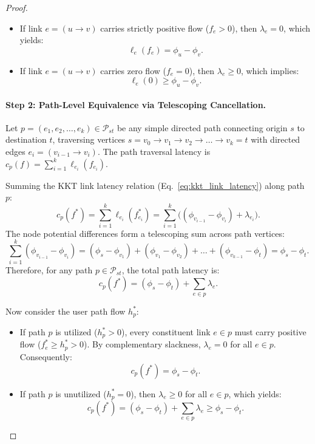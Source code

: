 \documentclass[11pt,a4paper]{article}
\begin{document}
\begin{proof}
\begin{itemize}
    \item If link $e = (u \to v)$ carries strictly positive flow ($f_e > 0$), then $\lambda_e = 0$, which yields:
    \begin{equation}
    \label{eq:active_edge_kkt}
    \ell_e(f_e) = \phi_u - \phi_v.
    \end{equation}
    \item If link $e = (u \to v)$ carries zero flow ($f_e = 0$), then $\lambda_e \ge 0$, which implies:
    \begin{equation}
    \label{eq:inactive_edge_kkt}
    \ell_e(0) \ge \phi_u - \phi_v.
    \end{equation}
\end{itemize}

\paragraph{Step 2: Path-Level Equivalence via Telescoping Cancellation.}
Let $p = (e_1, e_2, \dots, e_k) \in \mathcal{P}_{st}$ be any simple directed path connecting origin $s$ to destination $t$, traversing vertices $s = v_0 \to v_1 \to v_2 \to \dots \to v_k = t$ with directed edges $e_i = (v_{i-1} \to v_i)$. The path traversal latency is $c_p(f) = \sum_{i=1}^k \ell_{e_i}(f_{e_i})$.

Summing the KKT link latency relation (Eq.~\eqref{eq:kkt_link_latency}) along path $p$:
\begin{equation}
c_p(f^*) = \sum_{i=1}^k \ell_{e_i}(f_{e_i}^*) = \sum_{i=1}^k \big( (\phi_{v_{i-1}} - \phi_{v_i}) + \lambda_{e_i} \big).
\end{equation}
The node potential differences form a telescoping sum across path vertices:
\begin{equation}
\sum_{i=1}^k (\phi_{v_{i-1}} - \phi_{v_i}) = (\phi_s - \phi_{v_1}) + (\phi_{v_1} - \phi_{v_2}) + \dots + (\phi_{v_{k-1}} - \phi_t) = \phi_s - \phi_t.
\end{equation}
Therefore, for any path $p \in \mathcal{P}_{st}$, the total path latency is:
\begin{equation}
c_p(f^*) = (\phi_s - \phi_t) + \sum_{e \in p} \lambda_e.
\end{equation}

Now consider the user path flow $h_p^*$:
\begin{itemize}
    \item If path $p$ is utilized ($h_p^* > 0$), every constituent link $e \in p$ must carry positive flow ($f_e^* \ge h_p^* > 0$). By complementary slackness, $\lambda_e = 0$ for all $e \in p$. Consequently:
    \begin{equation}
    c_p(f^*) = \phi_s - \phi_t.
    \end{equation}
    \item If path $p$ is unutilized ($h_p^* = 0$), then $\lambda_e \ge 0$ for all $e \in p$, which yields:
    \begin{equation}
    c_p(f^*) = (\phi_s - \phi_t) + \sum_{e \in p} \lambda_e \ge \phi_s - \phi_t.
    \end{equation}
\end{itemize}


\end{proof}
\end{document}
